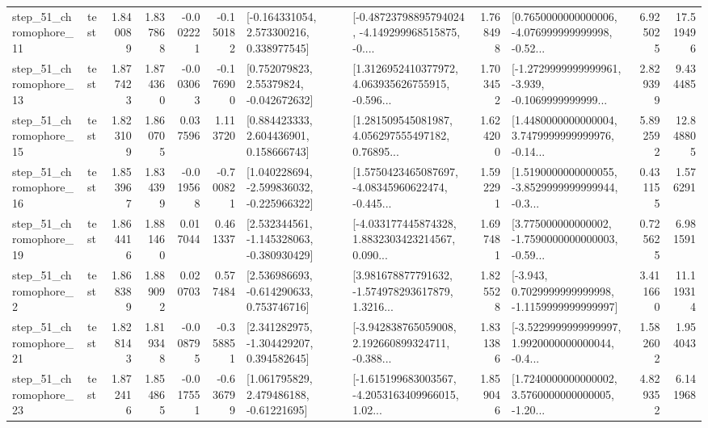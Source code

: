 \begin{tabular}{llrrrrllrlrr}
   step\_51\_chromophore\_11 &      test &      1.840089 &    1.837868 &     -0.002221 & -0.150182 &    [-0.164331054, 2.573300216, 0.338977545] &  [-0.48723798895794024, -4.149299968515875, -0.... &       1.768498 &  [0.7650000000000006, -4.076999999999998, -0.52... &            6.925025 &         17.519496 \\
   step\_51\_chromophore\_13 &      test &      1.877423 &    1.874360 &     -0.003063 & -0.176900 &     [0.752079823, 2.55379824, -0.042672632] &  [1.3126952410377972, 4.063935626755915, -0.596... &       1.703452 &  [-1.2729999999999961, -3.939, -0.1069999999999... &            2.829399 &          9.434485 \\
   step\_51\_chromophore\_15 &      test &      1.823109 &    1.860705 &      0.037596 &  1.113720 &     [0.884423333, 2.604436901, 0.158666743] &  [1.281509545081987, 4.056297555497182, 0.76895... &       1.624200 &  [1.4480000000000004, 3.7479999999999976, -0.14... &            5.892592 &         12.848805 \\
   step\_51\_chromophore\_16 &      test &      1.853967 &    1.834399 &     -0.019568 & -0.700821 &   [1.040228694, -2.599836032, -0.225966322] &  [1.5750423465087697, -4.08345960622474, -0.445... &       1.592291 &  [1.5190000000000055, -3.8529999999999944, -0.3... &            0.431155 &          1.576291 \\
   step\_51\_chromophore\_19 &      test &      1.864416 &    1.881460 &      0.017044 &  0.461337 &   [2.532344561, -1.145328063, -0.380930429] &  [-4.033177445874328, 1.8832303423214567, 0.090... &       1.697481 &  [3.775000000000002, -1.7590000000000003, -0.59... &            0.725625 &          6.981591 \\
    step\_51\_chromophore\_2 &      test &      1.868389 &    1.889092 &      0.020703 &  0.577484 &    [2.536986693, -0.614290633, 0.753746716] &  [3.981678877791632, -1.574978293617879, 1.3216... &       1.825528 &  [-3.943, 0.7029999999999998, -1.1159999999999997] &            3.411660 &         11.119314 \\
   step\_51\_chromophore\_21 &      test &      1.828143 &    1.819348 &     -0.008795 & -0.358851 &    [2.341282975, -1.304429207, 0.394582645] &  [-3.942838765059008, 2.192660899324711, -0.388... &       1.831386 &  [-3.5229999999999997, 1.9920000000000044, -0.4... &            1.582602 &          1.954043 \\
   step\_51\_chromophore\_23 &      test &      1.872416 &    1.854865 &     -0.017551 & -0.636799 &     [1.061795829, 2.479486188, -0.61221695] &  [-1.615199683003567, -4.2053163409966015, 1.02... &       1.859046 &  [1.7240000000000002, 3.5760000000000005, -1.20... &            4.829352 &          6.141968 \\

\end{tabular}
